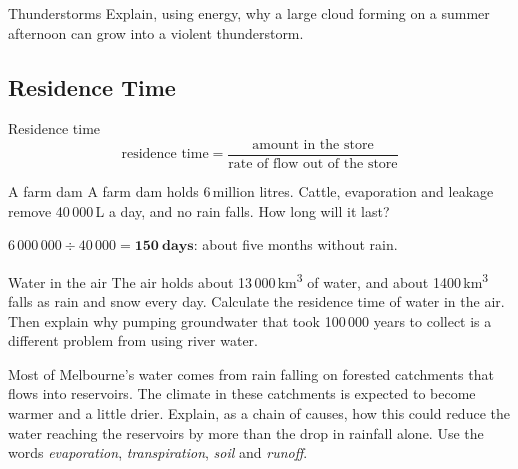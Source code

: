 \begin{wedo}{Thunderstorms}
Explain, using energy, why a large cloud forming on a summer afternoon can grow into a violent thunderstorm.
\answerbox{4.5cm}
\end{wedo}

\subsection{Residence Time}\label{sub:a1.2}

\begin{skillbox}{Residence time}
\[ \text{residence time} = \frac{\text{amount in the store}}{\text{rate of flow out of the store}} \]
\end{skillbox}

\begin{workedex}{A farm dam}
A farm dam holds 6\,million litres. Cattle, evaporation and leakage remove 40\,000\,L a day, and no rain falls. How long will it last?

\smallskip
$6\,000\,000 \div 40\,000 = \mathbf{150\ days}$: about five months without rain.
\end{workedex}

\begin{wedo}{Water in the air}
The air holds about 13\,000\,km\textsuperscript{3} of water, and about 1400\,km\textsuperscript{3} falls as rain and snow every day. Calculate the residence time of water in the air. Then explain why pumping groundwater that took 100\,000 years to collect is a different problem from using river water.
\workbox{5.5cm}
\end{wedo}

\label{prac:1}


\label{ext:1}

\task Most of Melbourne's water comes from rain falling on forested catchments that flows into reservoirs. The climate in these catchments is expected to become warmer and a little drier. Explain, as a chain of causes, how this could reduce the water reaching the reservoirs by more than the drop in rainfall alone. Use the words \emph{evaporation}, \emph{transpiration}, \emph{soil} and \emph{runoff}.
\answerbox{8cm}

\clearpage

\setcounter{section}{1}\renewcommand{\lessonart}{3}
\label{sec:2}

